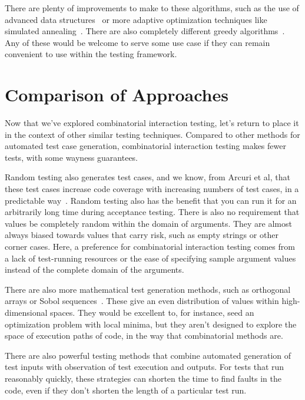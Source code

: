\documentclass{juliacon}
\begin{document}
\vskip 6pt
There are plenty of improvements to make to these algorithms, such as the use of advanced data structures~\cite{Segall2011-jv} or more adaptive optimization techniques like simulated annealing~\cite{Petke2015-ex}. There are also completely different greedy algorithms~\cite{Calvagna2012-ic,Koc2018-vs}. Any of these would be welcome to serve some use case if they can remain convenient to use within the testing framework.


\section{Comparison of Approaches}\label{sec:comparison}

Now that we've explored combinatorial interaction testing, let's return to place it in the context of other similar testing techniques. Compared to other methods for automated test case generation, combinatorial interaction testing makes fewer tests, with some wayness guarantees.

\vskip 6pt
Random testing also generates test cases, and we know, from Arcuri et al, that these test cases increase code coverage with increasing numbers of test cases, in a predictable way~\cite{Arcuri2012-az}. Random testing also has the benefit that you can run it for an arbitrarily long time during acceptance testing. There is also no requirement that values be completely random within the domain of arguments. They are almost always biased towards values that carry risk, such as empty strings or other corner cases. Here, a preference for combinatorial interaction testing comes from a lack of test-running resources or the ease of specifying sample argument values instead of the complete domain of the arguments.

\vskip 6pt
There are also more mathematical test generation methods, such as orthogonal arrays or Sobol sequences~\cite{He2013-th}. These give an even distribution of values within high-dimensional spaces. They would be excellent to, for instance, seed an optimization problem with local minima, but they aren't designed to explore the space of execution paths of code, in the way that combinatorial methods are.

\vskip 6pt
There are also powerful testing methods that combine automated generation of test inputs with observation of test execution and outputs. For tests that run reasonably quickly, these strategies can shorten the time to find faults in the code, even if they don't shorten the length of a particular test run.
\end{document}
